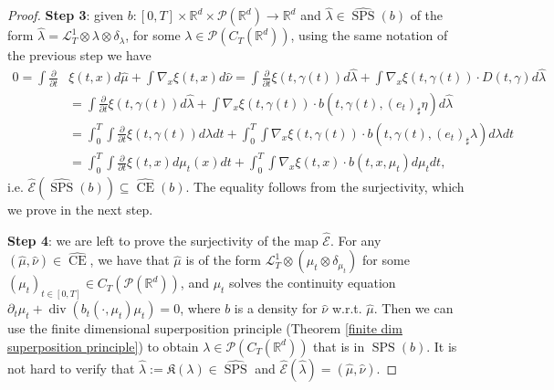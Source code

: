 \documentclass[10pt,leqno]{amsart}
\numberwithin{equation}{section}
\newcommand{\R}{\mathbb{R}}
\newcommand{\PP}{\mathcal{P}}
\begin{document}
\begin{proof}
    \textbf{Step 3}: given $b:[0,T]\times \R^d \times \PP(\R^d) \to \R^d$ and $\hat{\lambda} \in \hat{\operatorname{SPS}}(b)$ of the form $\hat{\lambda} = \mathcal{L}^1_T\otimes \lambda \otimes \delta_\lambda$, for some $\lambda \in \PP(C_T(\R^d))$, using the same notation of the previous step we have 
    \begin{align*}
        0 = \int \frac{\partial}{\partial t} & \xi(t,x) d\hat{\mu} + \int \nabla_x \xi(t,x) d\hat{\nu} = 
        \int \frac{\partial}{\partial t} \xi(t,\gamma(t)) d\hat{\lambda} + \int \nabla_x \xi(t,\gamma(t)) \cdot D(t,\gamma)d\hat{\lambda}
        \\
        & = 
        \int \frac{\partial}{\partial t} \xi(t,\gamma(t)) d\hat{\lambda} + \int \nabla_x \xi(t,\gamma(t)) \cdot b(t,\gamma(t),(e_t)_\sharp \eta)d\hat{\lambda}
        \\
        & = 
        \int_0^T\int \frac{\partial}{\partial t} \xi(t,\gamma(t)) d\lambda dt + \int_0^T\int \nabla_x \xi(t,\gamma(t)) \cdot b(t,\gamma(t),(e_t)_\sharp \lambda)d\lambda dt
        \\
        & = 
        \int_0^T\int \frac{\partial}{\partial t} \xi(t,x) d\mu_t(x) dt + \int_0^T\int \nabla_x \xi(t,x) \cdot b(t,x,\mu_t)d\mu_tdt,
    \end{align*}
    i.e. $\hat{\mathcal{E}}(\hat{\operatorname{SPS}}(b)) \subseteq \hat{\operatorname{CE}}(b)$. The equality follows from the surjectivity, which we prove in the next step. 

    \textbf{Step 4}: we are left to prove the surjectivity of the map $\hat{\mathcal{E}}$. For any $(\hat{\mu},\hat{\nu}) \in \hat{\operatorname{CE}}$, we have that $\hat{\mu}$ is of the form $\mathcal{L}^1_T\otimes (\mu_t\otimes \delta_{\mu_t})$ for some $(\mu_t)_{t\in[0,T]}\in C_T(\PP(\R^d))$, and $\mu_t$ solves the continuity equation $\partial_t\mu_t + \operatorname{div}(b_t(\cdot,\mu_t)\mu_t) = 0$, where $b$ is a density for $\hat{\nu}$ w.r.t. $\hat{\mu}$. Then we can use the finite dimensional superposition principle (Theorem \ref{finite dim superposition principle}) to obtain $\lambda\in \PP(C_T(\R^d))$ that is in $\operatorname{SPS}(b)$. It is not hard to verify that $\hat{\lambda}:= \mathfrak{K}(\lambda) \in \hat{\operatorname{SPS}}$ and $\hat{\mathcal{E}}(\hat{\lambda}) = (\hat{\mu},\hat{\nu})$.


\end{proof}
\end{document}
